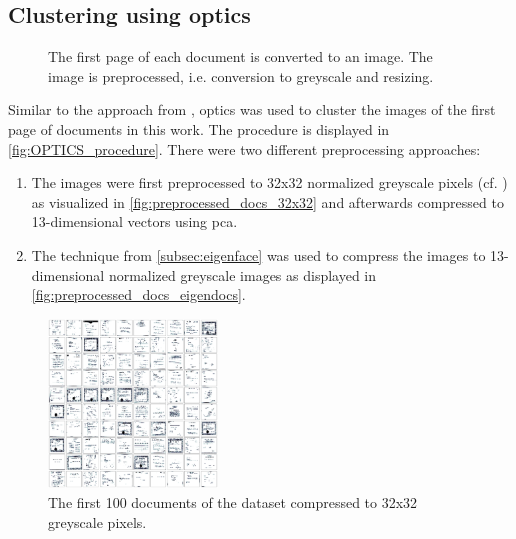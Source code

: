 \subsection{Clustering using \acs*{optics}}\label{subsec:impl-optics}

\begin{figure}[htp] %
    \centering
    
    \caption[\ac{optics} procedure]{The first page of each document is converted to an image.
    The image is preprocessed, i.e. conversion to greyscale and resizing.
    }
    \label{fig:OPTICS_procedure}
\end{figure}

Similar to the approach from \cite{OPTICS1999}, \ac{optics} was used to cluster the images of the first page of documents in this work.
The procedure is displayed in \autoref{fig:OPTICS_procedure}.
There were two different preprocessing approaches:
\begin{enumerate}
    \item \label{pt:32}The images were first preprocessed to 32x32 normalized greyscale pixels (cf. \cite{OPTICS1999}) as visualized in \autoref{fig:preprocessed_docs_32x32}
    and afterwards compressed to 13-dimensional vectors using \ac{pca}.
    \item \label{pt:eigendocs}The technique \eigendocs{} from \autoref{subsec:eigenface} 
    was used to compress the images to 13-dimensional normalized greyscale images as displayed in \autoref{fig:preprocessed_docs_eigendocs}.
\end{enumerate}


\begin{figure}[htp] %
    \centering
    \includegraphics[width=0.4\textwidth]{images/OPTICS/32x32/preprocessed_docs.pdf}
    \caption[Preprocessing to 32x32 normalized greyscale pixels]{The first 100 documents of the dataset compressed to 32x32 greyscale pixels.
    }
    \label{fig:preprocessed_docs_32x32}
\end{figure}


